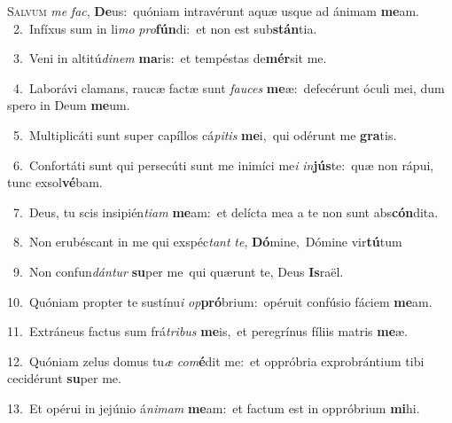 \lettrine{\initial\textcolor{\initialcolor}{S}}{alvum} \textit{me} \textit{fac}\-, \textbf{De}\-us:~\star quóniam intravérunt aquæ usque ad ánimam \textbf{me}\-am.\\
{\numbfont\textcolor{\numbcolor}{~2.}}~Infíxus sum in li\textit{mo} \textit{pro}\-\textbf{fún}di:~\star et non est sub\-\textbf{stán}\-tia.\par
{\numbfont\textcolor{\numbcolor}{~3.}}~Veni in altitú\-\textit{di}\-\textit{nem} \textbf{ma}\-ris:~\star et tempéstas de\-\textbf{mér}\-sit me.\par
{\numbfont\textcolor{\numbcolor}{~4.}}~Laborávi clamans, raucæ factæ sunt \textit{fau}\-\textit{ces} \textbf{me}\-æ:~\star defecérunt óculi mei, dum spero in Deum \textbf{me}\-um.\par
{\numbfont\textcolor{\numbcolor}{~5.}}~Multiplicáti sunt super capíllos cá\-\textit{pi}\-\textit{tis} \textbf{me}\-i,~\star qui odérunt me \textbf{gra}\-tis.\par
{\numbfont\textcolor{\numbcolor}{~6.}}~Confortáti sunt qui persecúti sunt me inimíci me\textit{i} \textit{in}\-\textbf{jús}te:~\star quæ non rápui, tunc exsol\-\textbf{vé}\-bam.\par
{\numbfont\textcolor{\numbcolor}{~7.}}~Deus, tu scis insipién\-\textit{ti}\-\textit{am} \textbf{me}\-am:~\star et delícta mea a te non sunt abs\-\textbf{cón}\-dita.\par
{\numbfont\textcolor{\numbcolor}{~8.}}~Non erubéscant in me qui exspéc\textit{tant} \textit{te}\-, \textbf{Dó}\-mine,~\star Dómine vir\-\textbf{tú}\-tum\par
{\numbfont\textcolor{\numbcolor}{~9.}}~Non confun\-\textit{dán}\-\textit{tur} \textbf{su}\-per me~\star qui quærunt te, Deus \textbf{Is}\-raël.\par
{\numbfont\textcolor{\numbcolor}{10.}}~Quóniam propter te sustínu\textit{i} \textit{op}\-\textbf{pró}brium:~\star opéruit confúsio fáciem \textbf{me}\-am.\par
{\numbfont\textcolor{\numbcolor}{11.}}~Extráneus factus sum frá\-\textit{tri}\-\textit{bus} \textbf{me}\-is,~\star et peregrínus fíliis matris \textbf{me}\-æ.\par
{\numbfont\textcolor{\numbcolor}{12.}}~Quóniam zelus domus tu\textit{æ} \textit{com}\-\textbf{é}dit me:~\star et oppróbria exprobrántium tibi cecidérunt \textbf{su}\-per me.\par
{\numbfont\textcolor{\numbcolor}{13.}}~Et opérui in jejúnio á\-\textit{ni}\-\textit{mam} \textbf{me}\-am:~\star et factum est in oppróbrium \textbf{mi}\-hi.\par
